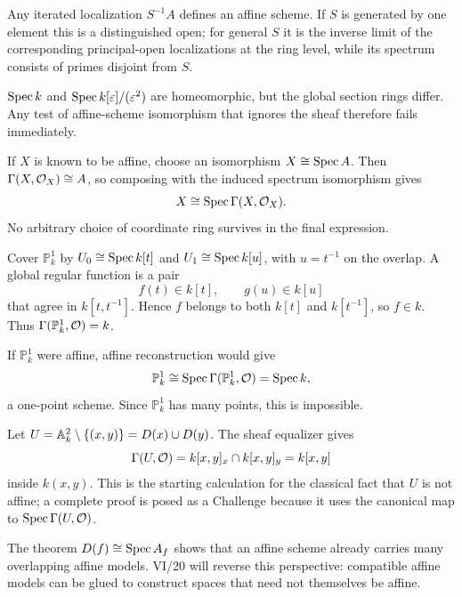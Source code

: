 \begin{example}
Any iterated localization $S^{-1}A$ defines an affine scheme.  If $S$ is generated by one
element this is a distinguished open; for general $S$ it is the inverse limit of the
corresponding principal-open localizations at the ring level, while its spectrum consists of
primes disjoint from $S$.
\end{example}

\begin{example}
$\operatorname{Spec} k$ and $\operatorname{Spec} k[\varepsilon]/(\varepsilon^2)$ are homeomorphic, but the global
section rings differ.  Any test of affine-scheme isomorphism that ignores the sheaf therefore
fails immediately.
\end{example}

\begin{example}
If $X$ is known to be affine, choose an isomorphism $X\cong\operatorname{Spec} A$.  Then
$\Gamma(X,\mathcal O_X)\cong A$, so composing with the induced spectrum isomorphism gives
\[
X\cong\operatorname{Spec}\Gamma(X,\mathcal O_X).
\]
No arbitrary choice of coordinate ring survives in the final expression.
\end{example}

\begin{example}
Cover $\mathbb P^1_k$ by $U_0\cong\operatorname{Spec} k[t]$ and $U_1\cong\operatorname{Spec} k[u]$, with
$u=t^{-1}$ on the overlap.  A global regular function is a pair
\[
f(t)\in k[t],\qquad g(u)\in k[u]
\]
that agree in $k[t,t^{-1}]$.  Hence $f$ belongs to both $k[t]$ and $k[t^{-1}]$, so $f\in k$.
Thus $\Gamma(\mathbb P^1_k,\mathcal O)=k$.
\end{example}

\begin{example}
If $\mathbb P^1_k$ were affine, affine reconstruction would give
\[
\mathbb P^1_k\cong\operatorname{Spec}\Gamma(\mathbb P^1_k,\mathcal O)=\operatorname{Spec} k,
\]
a one-point scheme.  Since $\mathbb P^1_k$ has many points, this is impossible.
\end{example}

\begin{example}
Let $U=\mathbb A^2_k\setminus\{(x,y)\} = D(x)\cup D(y)$.  The sheaf equalizer gives
\[
\Gamma(U,\mathcal O)=k[x,y]_x\cap k[x,y]_y=k[x,y]
\]
inside $k(x,y)$.  This is the starting calculation for the classical fact that $U$ is not
affine; a complete proof is posed as a Challenge because it uses the canonical map to
$\operatorname{Spec}\Gamma(U,\mathcal O)$.
\end{example}

\begin{example}
The theorem $D(f)\cong\operatorname{Spec} A_f$ shows that an affine scheme already carries many overlapping
affine models.  VI/20 will reverse this perspective: compatible affine models can be glued to
construct spaces that need not themselves be affine.
\end{example}
